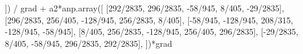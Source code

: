 \documentclass[
  11pt,
]{article}
\newenvironment{Shaded}{}{}
\newcommand{\DecValTok}[1]{\textcolor[rgb]{0.25,0.63,0.44}{#1}}
\newcommand{\NormalTok}[1]{#1}
\newcommand{\OperatorTok}[1]{\textcolor[rgb]{0.40,0.40,0.40}{#1}}
\begin{document}
\begin{Shaded}
\begin{Highlighting}[]
\NormalTok{        ]) }\OperatorTok{/}\NormalTok{ grad }\OperatorTok{+}\NormalTok{ a2}\OperatorTok{*}\NormalTok{anp.array([}
\NormalTok{            [}\DecValTok{292}\OperatorTok{/}\DecValTok{2835}\NormalTok{, }\DecValTok{296}\OperatorTok{/}\DecValTok{2835}\NormalTok{, }\OperatorTok{{-}}\DecValTok{58}\OperatorTok{/}\DecValTok{945}\NormalTok{, }\DecValTok{8}\OperatorTok{/}\DecValTok{405}\NormalTok{, }\OperatorTok{{-}}\DecValTok{29}\OperatorTok{/}\DecValTok{2835}\NormalTok{],}
\NormalTok{            [}\DecValTok{296}\OperatorTok{/}\DecValTok{2835}\NormalTok{, }\DecValTok{256}\OperatorTok{/}\DecValTok{405}\NormalTok{, }\OperatorTok{{-}}\DecValTok{128}\OperatorTok{/}\DecValTok{945}\NormalTok{, }\DecValTok{256}\OperatorTok{/}\DecValTok{2835}\NormalTok{, }\DecValTok{8}\OperatorTok{/}\DecValTok{405}\NormalTok{],}
\NormalTok{            [}\OperatorTok{{-}}\DecValTok{58}\OperatorTok{/}\DecValTok{945}\NormalTok{, }\OperatorTok{{-}}\DecValTok{128}\OperatorTok{/}\DecValTok{945}\NormalTok{, }\DecValTok{208}\OperatorTok{/}\DecValTok{315}\NormalTok{, }\OperatorTok{{-}}\DecValTok{128}\OperatorTok{/}\DecValTok{945}\NormalTok{, }\OperatorTok{{-}}\DecValTok{58}\OperatorTok{/}\DecValTok{945}\NormalTok{],}
\NormalTok{            [}\DecValTok{8}\OperatorTok{/}\DecValTok{405}\NormalTok{, }\DecValTok{256}\OperatorTok{/}\DecValTok{2835}\NormalTok{, }\OperatorTok{{-}}\DecValTok{128}\OperatorTok{/}\DecValTok{945}\NormalTok{, }\DecValTok{256}\OperatorTok{/}\DecValTok{405}\NormalTok{, }\DecValTok{296}\OperatorTok{/}\DecValTok{2835}\NormalTok{],}
\NormalTok{            [}\OperatorTok{{-}}\DecValTok{29}\OperatorTok{/}\DecValTok{2835}\NormalTok{, }\DecValTok{8}\OperatorTok{/}\DecValTok{405}\NormalTok{, }\OperatorTok{{-}}\DecValTok{58}\OperatorTok{/}\DecValTok{945}\NormalTok{, }\DecValTok{296}\OperatorTok{/}\DecValTok{2835}\NormalTok{, }\DecValTok{292}\OperatorTok{/}\DecValTok{2835}\NormalTok{],}
\NormalTok{        ])}\OperatorTok{*}\NormalTok{grad}



\end{Highlighting}
\end{Shaded}
\end{document}
